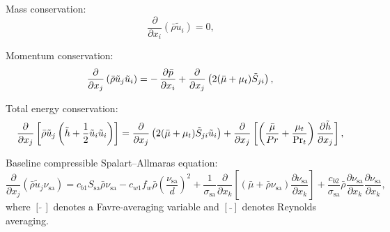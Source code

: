\documentclass[10pt]{article}
\newcommand{\pp}[2]{\frac{\partial #1}{\partial #2}}
\newcommand{\sa}{\nu_{\mathrm{sa}}}
\newcommand{\tsa}{\mathrm{sa}}
\begin{document}
Mass conservation:
\begin{equation}\label{eq:ns01}
 \pp{}{x_i} (\bar{\rho}\tilde{u}_i) = 0, 
\end{equation}

Momentum conservation:
\begin{equation}\label{eq:ns02}
 \pp{}{x_j} \left(\bar{\rho} \tilde{u}_j \tilde{u}_i  \right) = - \, \pp{\bar{p}}{x_i} + \pp{}{x_j}\left( 2 (\bar{\mu} + \mu_t) \tilde{S}_{ji} \right), \\
\end{equation}

Total energy conservation:
\begin{equation}\label{eq:ns03}
 \pp{}{x_j} \left[ \bar{\rho} \tilde{u}_j \left( \tilde{h} + \frac{1}{2} \tilde{u}_i \tilde{u}_i \right) \right] =  \pp{}{x_j} \left( 2 (\bar{\mu} + \mu_t) \tilde{S}_{ji} \tilde{u}_i \right) + \pp{}{x_j} \left[ \left( \frac{\bar{\mu}}{\\Pr} + \frac{\mu_t}{\Pr_t} \right) \pp{\tilde{h}}{x_j} \right], \\
\end{equation}

Baseline compressible Spalart--Allmaras equation:
\begin{equation}\label{eq:ns04}
 \pp{}{x_j} (\bar{\rho} \tilde{u}_j \sa) =  c_{b1} S_{\mathrm{sa}} \bar{\rho} \sa - c_{w1} f_w \bar{\rho} \left( \frac{\sa}{d} \right)^2 + \frac{1}{\sigma_{\tsa}} \pp{}{x_k} \left[ (\bar{\mu} + \bar{\rho} \sa) \pp{\sa}{x_k} \right] + \frac{c_{b2}}{\sigma_{\tsa}} \bar{\rho} \pp{\sa}{x_k} \pp{\sa}{x_k},
\end{equation}
%
where $[\tilde{\,\,}]$ denotes a Favre-averaging variable and $[\bar{\,\,}]$ denotes Reynolds averaging.
\end{document}
